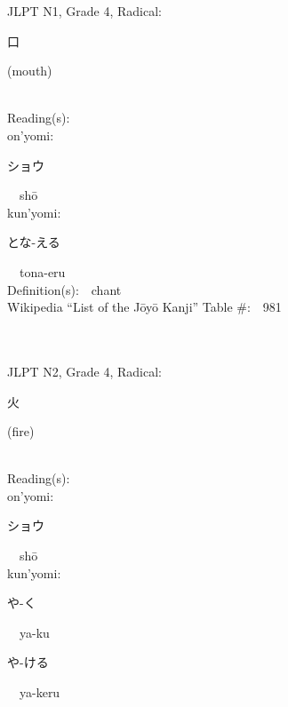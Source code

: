 \begin{multicols}{2}
{JLPT N1, Grade 4, Radical:\ \ {\begin{CJK}{UTF8}{min} 口 \end{CJK}} (mouth) } \\
Reading(s):\ \ \\
{\hspace*{1em}}on'yomi:\ \ \\
{\hspace*{2em}}{\begin{CJK}{UTF8}{min} ショウ \end{CJK}}\ \ sh\=o\ \ \\
{\hspace*{1em}}kun'yomi:\ \ \\
{\hspace*{2em}}{\begin{CJK}{UTF8}{min} とな-える \end{CJK}}\ \ tona-eru\ \ \\
Definition(s):\ \ chant \\
Wikipedia ``List of the J\=oy\=o Kanji'' Table \#:\ \ 981 \\
\ \ \\
{\fontsize{34pt}{40pt}  }\ \ \\  %
{JLPT N2, Grade 4, Radical:\ \ {\begin{CJK}{UTF8}{min} 火 \end{CJK}} (fire) } \\
Reading(s):\ \ \\
{\hspace*{1em}}on'yomi:\ \ \\
{\hspace*{2em}}{\begin{CJK}{UTF8}{min} ショウ \end{CJK}}\ \ sh\=o\ \ \\
{\hspace*{1em}}kun'yomi:\ \ \\
{\hspace*{2em}}{\begin{CJK}{UTF8}{min} や-く \end{CJK}}\ \ ya-ku\ \ \\
{\hspace*{2em}}{\begin{CJK}{UTF8}{min} や-ける \end{CJK}}\ \ ya-keru\ \ \\

\end{multicols}
